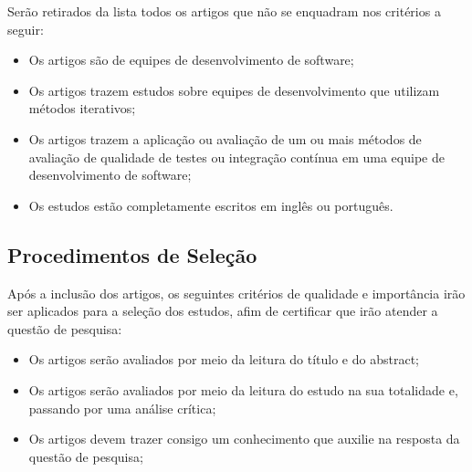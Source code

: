 Serão retirados da lista todos os artigos que não se enquadram nos
critérios a seguir:

\begin{itemize}
    \item Os artigos são de equipes de desenvolvimento de software;
    \item Os artigos trazem estudos sobre equipes de desenvolvimento que
        utilizam métodos iterativos;
    \item Os artigos trazem a aplicação ou avaliação de um ou mais
        métodos de avaliação de qualidade de testes ou integração contínua
        em uma equipe de desenvolvimento de software;
    \item Os estudos estão completamente escritos em inglês ou português.
\end{itemize}

\subsection{Procedimentos de Seleção}
\label{sub:Procedimentos de Seleção}

Após a inclusão dos artigos, os seguintes critérios de qualidade e
importância irão ser aplicados para a seleção dos estudos, afim de certificar que
irão atender a questão de pesquisa:

\begin{itemize}
    \item Os artigos serão avaliados por meio da leitura do título e do abstract;
    \item Os artigos serão avaliados por meio da leitura do estudo na sua
        totalidade e, passando por uma análise crítica;
    \item Os artigos devem trazer consigo um conhecimento que auxilie na
        resposta da questão de pesquisa;
\end{itemize}
